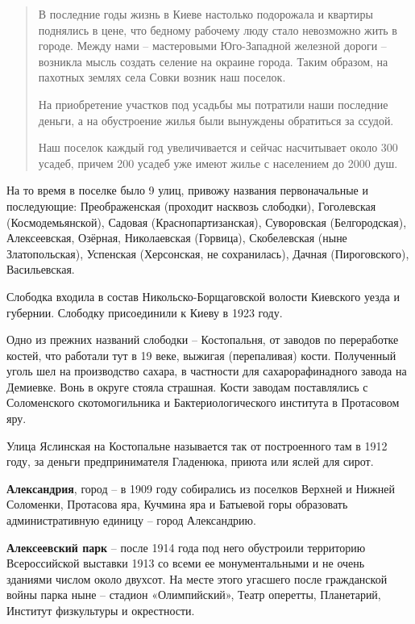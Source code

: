 \begin{quotation}
В последние годы жизнь в Киеве настолько подорожала и квартиры по\-днялись в цене, что бедному рабочему люду стало невозможно жить в городе. Между нами – мастеровыми Юго-Западной железной дороги – возникла мысль создать селение на окраине города. Таким образом, на пахотных землях села Совки возник наш поселок.

На приобретение участков под уса\-дьбы мы потратили наши последние деньги, а на обустроение жилья были вынуждены обратиться за ссудой. 

Наш поселок каждый год увеличивается и сейчас насчитывает около 300 усадеб, причем 200 усадеб уже имеют жилье с населением до 2000 душ.
\end{quotation}

На то время в поселке было 9 улиц, привожу названия первоначальные и последующие: Преображенская (проходит насквозь слободки), Гоголевская (Космодемьянской), Садовая (Краснопартизанская), Суворовская (Белгородская), Алексеевская, Озёрная, Николаевская (Горвица), Скобелевская (ныне Златопольская), Успенская (Херсонская, не сохранилась), Дачная (Пироговского),  Васильевская.

Слободка входила в состав Никольско-Борща\-говской волости Киевского уезда и губернии. Слободку присоединили к Киеву в 1923 году.

Одно из прежних названий слободки – Костопальня, от заводов по переработке костей, что работали тут в 19 веке, выжигая (перепаливая) кости. Полученный уголь шел на производство сахара, в частности для сахарорафинадного завода на Демиевке. Вонь в округе стояла страшная. Кости заводам поставлялись с Соломенского скотомогильника и Бактериологического института в Протасовом яру.

Улица Яслинская на Костопальне называется так от построенного там в 1912 году, за деньги предпринимателя Гладенюка, приюта или яслей для сирот.\\

\medskip

\textbf{Александрия}, город – в 1909 году собирались из поселков Верхней и Нижней Соломенки, Протасова яра, Кучмина яра и Батыевой горы образовать административную единицу – город Александрию.\\

\medskip

\textbf{Алексеевский парк} – после 1914 года под него обустроили территорию Всероссийской выставки 1913 со всеми ее монументальными и не очень зданиями числом около двухсот. На месте этого угасшего после гражданской войны парка ныне – стадион «Олимпийский», Театр оперетты, Планетарий, Институт физкультуры и окрестности.\\

